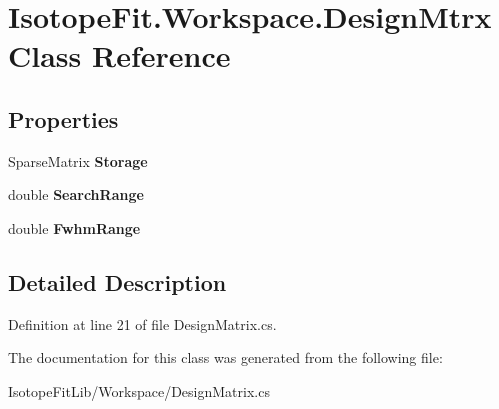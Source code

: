 \hypertarget{class_isotope_fit_1_1_workspace_1_1_design_mtrx}{}\section{Isotope\+Fit.\+Workspace.\+Design\+Mtrx Class Reference}
\label{class_isotope_fit_1_1_workspace_1_1_design_mtrx}
\subsection*{Properties}
\begin{DoxyCompactItemize}
\item 
\mbox{\label{class_isotope_fit_1_1_workspace_1_1_design_mtrx_a3e739d17d113e00d32b5f6b81d35a368}} 
Sparse\+Matrix {\bfseries Storage}
\item 
\mbox{\label{class_isotope_fit_1_1_workspace_1_1_design_mtrx_abd45f69ed8e83a14f7ed2bcc30fbaddf}} 
double {\bfseries Search\+Range}
\item 
\mbox{\label{class_isotope_fit_1_1_workspace_1_1_design_mtrx_a3341c9aabd7c8efe9b8b422941d72b8b}} 
double {\bfseries Fwhm\+Range}
\end{DoxyCompactItemize}


\subsection{Detailed Description}


Definition at line 21 of file Design\+Matrix.\+cs.



The documentation for this class was generated from the following file\+:\begin{DoxyCompactItemize}
\item 
Isotope\+Fit\+Lib/\+Workspace/Design\+Matrix.\+cs\end{DoxyCompactItemize}
